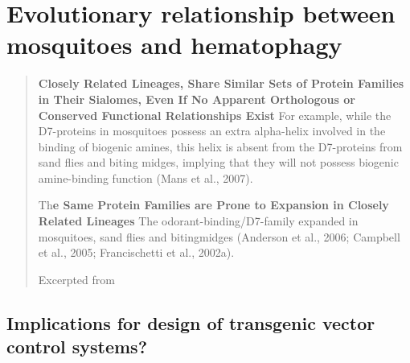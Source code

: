 \section{Evolutionary relationship between mosquitoes and hematophagy}
\begin{quotation}
\textbf{Closely Related Lineages, Share Similar Sets of Protein Families
in Their Sialomes, Even If No Apparent Orthologous or Conserved
Functional Relationships Exist}
For example, while the D7-proteins in mosquitoes possess an extra alpha-helix
involved in the binding of biogenic amines, this helix is absent from the D7-proteins from sand flies and biting midges, implying that they will not possess biogenic amine-binding function (Mans et al., 2007).

Th\textbf{e Same Protein Families are Prone to Expansion in Closely Related Lineages}
The odorant-binding/D7-family expanded in mosquitoes, sand flies and bitingmidges (Anderson et al., 2006; Campbell et al., 2005; Francischetti et al., 2002a).

Excerpted from \cite{Markland2011}
\end{quotation} 

\dummytext[3]

\subsection{Implications for design of transgenic vector control systems?}
\dummytext[3]


